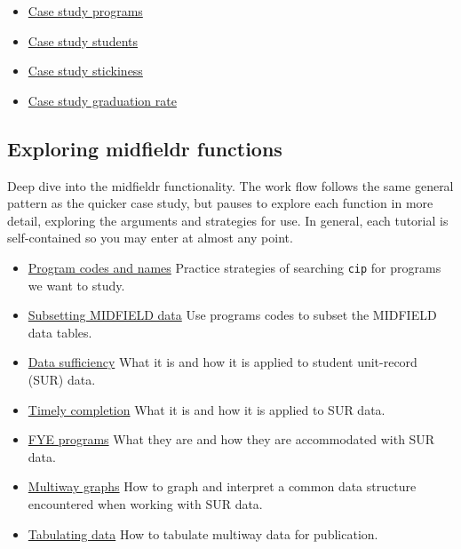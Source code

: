 \documentclass[
]{book}
\providecommand{\tightlist}{%
  \setlength{\itemsep}{0pt}\setlength{\parskip}{0pt}}
\begin{document}
\begin{itemize}
\tightlist
\item
  \href{https://midfieldr.github.io/midfieldr/articles/art-002-case-study-programs.html}{Case study programs}
\item
  \href{https://midfieldr.github.io/midfieldr/articles/art-004-case-study-students.html}{Case study students}
\item
  \href{https://midfieldr.github.io/midfieldr/articles/art-006-case-study-stickiness.html}{Case study stickiness}
\item
  \href{https://midfieldr.github.io/midfieldr/articles/art-008-case-study-grad-rate.html}{Case study graduation rate}
\end{itemize}

\hypertarget{exploring-midfieldr-functions}{%
\subsection{Exploring midfieldr functions}\label{exploring-midfieldr-functions}}

Deep dive into the midfieldr functionality. The work flow follows the same general pattern as the quicker case study, but pauses to explore each function in more detail, exploring the arguments and strategies for use. In general, each tutorial is self-contained so you may enter at almost any point.

\begin{itemize}
\tightlist
\item
  \href{https://midfieldr.github.io/midfieldr/articles/art-010-program-codes.html}{Program codes and names} Practice strategies of searching \texttt{cip} for programs we want to study.
\item
  \href{https://midfieldr.github.io/midfieldr/articles/art-015-subsetting-midfield-data.html}{Subsetting MIDFIELD data} Use programs codes to subset the MIDFIELD data tables.
\item
  \href{https://midfieldr.github.io/midfieldr/articles/art-020-data-sufficiency.html}{Data sufficiency} What it is and how it is applied to student unit-record (SUR) data.
\item
  \href{https://midfieldr.github.io/midfieldr/articles/art-030-timely-completion.html}{Timely completion} What it is and how it is applied to SUR data.
\item
  \href{https://midfieldr.github.io/midfieldr/articles/art-040-fye-programs.html}{FYE programs} What they are and how they are accommodated with SUR data.
\item
  \href{https://midfieldr.github.io/midfieldr/articles/art-050-multiway-graphs.html}{Multiway graphs} How to graph and interpret a common data structure encountered when working with SUR data.
\item
  \href{https://midfieldr.github.io/midfieldr/articles/art-060-tabulating-data.html}{Tabulating data} How to tabulate multiway data for publication.
\end{itemize}
\end{document}
